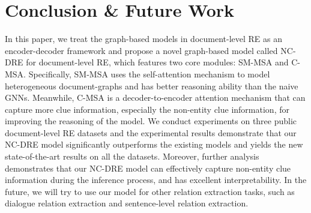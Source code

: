 \documentclass[sigconf,natbib=true]{acmart}
\begin{document}
\section{Conclusion \& Future Work}
In this paper, we treat the graph-based models in document-level RE as an encoder-decoder framework and propose a novel graph-based model called NC-DRE for document-level RE, which features two core modules: SM-MSA and C-MSA.
Specifically, SM-MSA uses the self-attention mechanism to model heterogeneous document-graphs and has better reasoning ability than the naive GNNs.
Meanwhile, C-MSA is a decoder-to-encoder attention mechanism that can capture more clue information, especially the non-entity clue information, for improving the reasoning of the model.
We conduct experiments on three public document-level RE datasets and the experimental results demonstrate that
our NC-DRE model significantly outperforms the existing models and yields the new state-of-the-art results on all the datasets.
Moreover, further analysis demonstrates that our NC-DRE model can effectively capture non-entity clue information during the inference process, and has excellent interpretability.
In the future, we will try to use our model for other relation extraction tasks, such as dialogue relation extraction and sentence-level relation extraction.


\clearpage







\end{document}

